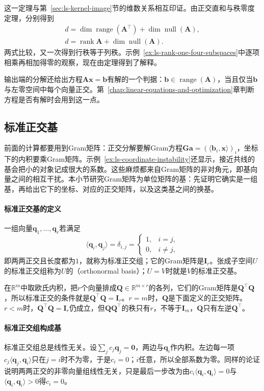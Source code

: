 这一定理与第~\ref{sec:ls-kernel-image}节的维数关系相互印证。由正交直和与秩零度定理，分别得到
\[
 \begin{gathered}
d=\dim\operatorname{range}(\bm A^\top)+\dim\operatorname{null}(\bm A),\\
d=\operatorname{rank}\bm A+\dim\operatorname{null}(\bm A).
 \end{gathered}
\]
两式比较，又一次得到行秩等于列秩。示例~\ref{ex:ls-rank-one-four-subspaces}中逐项相乘再相加得零的观察，现在由定理得到了解释。

输出端的分解还给出方程$\bm A\bm x=\bm b$有解的一个判据：$\bm b\in\operatorname{range}(\bm A)$，当且仅当$\bm b$与左零空间中每个向量正交。第~\ref{chap:linear-equations-and-optimization}章判断方程是否有解时会用到这一点。

\subsection{标准正交基}
\label{sec:ls-orthonormal-bases}

前面的计算都要用到Gram矩阵：正交分解要解Gram方程$\bm G\bm a=(\langle\bm b_i,\bm x\rangle)_i$，坐标下的内积要乘Gram矩阵。示例~\ref{ex:ls-coordinate-instability}还显示，接近共线的基会把小的对象记成很大的系数。这些麻烦都来自Gram矩阵的非对角元，即基向量之间的相互干扰。本小节研究Gram矩阵为单位矩阵的基：先证明它确实是一组基，再给出它下的坐标、对应的正交矩阵，以及这类基之间的换基。

\paragraph{标准正交基的定义}
一组向量$\bm q_1,\ldots,\bm q_r$若满足
\[
 \langle\bm q_i,\bm q_j\rangle=\delta_{i,j}=\begin{cases}1,&i=j,\\0,&i\neq j,\end{cases}
\]
即两两正交且长度都为$1$，就称为标准正交组；它的Gram矩阵是$\bm I_r$。张成子空间$U$的标准正交组称为$U$的（orthonormal basis）；$U=V$时就是$V$的标准正交基。

在$\mathbb R^m$中取欧氏内积，把$r$个向量排成$\bm Q\in\mathbb R^{m\times r}$的各列，它们的Gram矩阵是$\bm Q^\top\bm Q$，所以标准正交的条件就是$\bm Q^\top\bm Q=\bm I_r$。$r=m$时，$\bm Q$是下面定义的正交矩阵。$r<m$时，$\bm Q^\top\bm Q=\bm I_r$仍成立，但$\bm Q\bm Q^\top$的秩只有$r$，不等于$\bm I_m$，$\bm Q$只有左逆$\bm Q^\top$。

\paragraph{标准正交组构成基}
标准正交组总是线性无关。设$\sum_jc_j\bm q_j=\bm0$，两边与$\bm q_i$作内积。左边每一项$c_j\langle\bm q_j,\bm q_i\rangle$只在$j=i$时不为零，于是$c_i=0$；$i$任意，所以全部系数为零。同样的论证说明两两正交的非零向量组线性无关，只是最后一步改为由$c_i\langle\bm q_i,\bm q_i\rangle=0$与$\langle\bm q_i,\bm q_i\rangle>0$得$c_i=0$。


